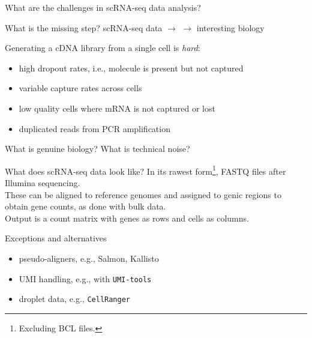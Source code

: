 \documentclass{beamer}
\begin{document}
\begin{frame}{What are the challenges in scRNA-seq data analysis?}
    \begin{alertblock}{What is the missing step?}
    scRNA-seq data $\to$  $\to$ interesting biology \\[0.1in]
\end{alertblock}
    \pause
    Generating a cDNA library from a single cell is \textit{hard}:\\[0.1em]
    \begin{itemize}
        \setlength\itemsep{0.5em}
        \item high dropout rates, i.e., molecule is present but not captured
        \item variable capture rates across cells
        \item low quality cells where mRNA is not captured or lost
        \item duplicated reads from PCR amplification 
    \end{itemize}
    \vspace{0.1in}
    What is genuine biology? What is technical noise? 
\end{frame}

\begin{frame}{What does scRNA-seq data look like?}
In its rawest form\footnote{Excluding BCL files.}, FASTQ files after Illumina sequencing. \\[0.1in]

These can be aligned to reference genomes and assigned to genic regions to obtain gene counts, as done with bulk data. \\[0.1in]

Output is a count matrix with genes as rows and cells as columns. \\[0.1in]

\begin{exampleblock}{Exceptions and alternatives}
\begin{itemize}
    \item pseudo-aligners, e.g., Salmon, Kallisto
    \item UMI handling, e.g., with \texttt{UMI-tools}
    \item droplet data, e.g., \texttt{CellRanger}
\end{itemize}
\end{exampleblock}
\end{frame}
\end{document}
